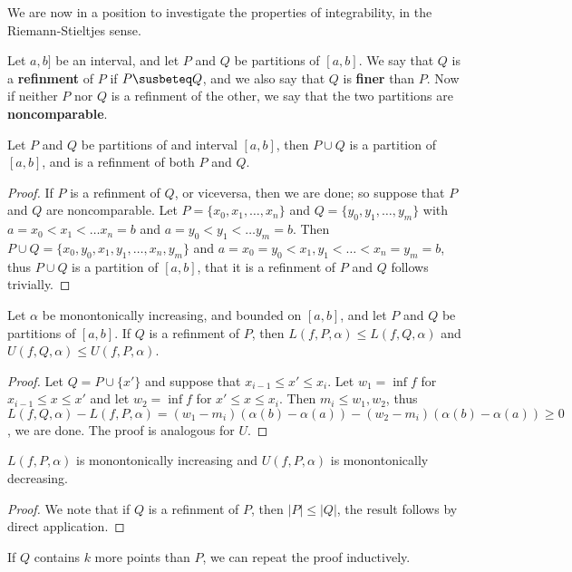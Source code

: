 We are now in a position to investigate the properties of integrability, in the
Riemann-Stieltjes sense.

\begin{definition}
    Let $a,b]$ be an interval, and let  $P$ and  $Q$ be partitions of  $[a,b]$.
    We say that  $Q$ is a \textbf{refinment} of $P$ if  $P \susbeteq Q$, and we
    also say that $Q$ is \textbf{finer} than  $P$. Now if neither  $P$ nor  $Q$
    is a refinment of the other, we say that the two partitions are
    \textbf{noncomparable}.
\end{definition}

\begin{lemma}\label{7.1.2}
    Let $P$ and  $Q$ be partitions of and interval $[a,b]$, then  $P \cup Q$ is
    a partition of  $[a,b]$, and is a refinment of both  $P$ and  $Q$.
\end{lemma}
\begin{proof}
    If $P$ is a refinment of  $Q$, or viceversa, then we are done; so suppose
    that  $P$ and  $Q$ are noncomparable. Let  $P=\{x_0,x_1, \dots, x_n\}$ and
    $Q=\{y_0,y_1, \dots, y_m\}$ with $a=x_0<x_1< \dots x_n=b$ and $a=y_0<y_1<
    \dots y_m=b$. Then $P \cup Q=\{x_0,y_0,x_1,y_1, \dots, x_n,y_m\}$ and
    $a=x_0=y_0 < x_1,y_1 < \dots <x_n=y_m=b$, thus $P \cup Q$ is a partition of
    $[a,b]$, that it is a refinment of  $P$ and  $Q$ follows trivially.
\end{proof}

\begin{theorem}\label{7.1.3}
    Let $\alpha$ be monontonically increasing, and bounded on  $[a,b]$, and let
    $P$ and  $Q$ be partitions of  $[a,b]$. If  $Q$ is a refinment of  $P$, then
    $L(f,P,\alpha) \leq L(f,Q,\alpha)$ and  $U(f,Q,\alpha) \leq U(f,P,\alpha)$.
\end{theorem}
\begin{proof}
    Let $Q=P \cup \{x'\}$ and suppose that  $x_{i-1} \leq x' \leq x_i$.  Let
    $w_1=\inf{f}$ for $x_{i-1} \leq x \leq x'$ and let $w_2=\inf{f}$ for $x'
    \leq x \leq x_i$. Then $m_i \leq w_1,w_2$, thus
    $L(f,Q,\alpha)-L(f,P,\alpha)=(w_1-m_i)(\alpha(b)-\alpha(a))-(w_2-m_i)(\alpha(b)-\alpha(a))
    \geq 0$, we are done. The proof is analogous for $U$.
\end{proof}
\begin{corollary}
    $L(f,P,\alpha)$ is monontonically increasing and  $U(f,P,\alpha)$ is
    monontonically decreasing.
\end{corollary}
\begin{proof}
    We note that if $Q$ is a refinment of  $P$, then  $|P| \leq |Q|$, the result
    follows by direct application.
\end{proof}
\begin{remark}
    If $Q$ contains  $k$ more points than  $P$, we can repeat the proof
    inductively.
\end{remark}

